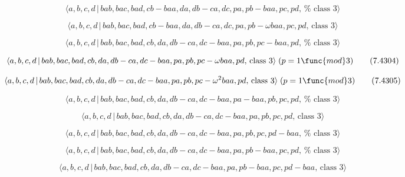 \documentclass[10pt]{article}
\begin{document}
\begin{equation}
\langle a,b,c,d\,|\,bab,bac,bad,cb-baa,da,db-ca,dc,pa,pb-baa,pc,pd,\,\text{%
class }3\rangle  \tag{7.4301}
\end{equation}

\begin{equation}
\langle a,b,c,d\,|\,bab,bac,bad,cb-baa,da,db-ca,dc,pa,pb-\omega baa,pc,pd,\,%
\text{class }3\rangle  \tag{7.4302}
\end{equation}

\begin{equation}
\langle a,b,c,d\,|\,bab,bac,bad,cb,da,db-ca,dc-baa,pa,pb,pc-baa,pd,\,\text{%
class }3\rangle  \tag{7.4303}
\end{equation}

\begin{equation}
\langle a,b,c,d\,|\,bab,bac,bad,cb,da,db-ca,dc-baa,pa,pb,pc-\omega baa,pd,\,%
\text{class }3\rangle \;(p=1\func{mod}3)  \tag{7.4304}
\end{equation}

\begin{equation}
\langle a,b,c,d\,|\,bab,bac,bad,cb,da,db-ca,dc-baa,pa,pb,pc-\omega
^{2}baa,pd,\,\text{class }3\rangle \;(p=1\func{mod}3)  \tag{7.4305}
\end{equation}

\begin{equation}
\langle a,b,c,d\,|\,bab,bac,bad,cb,da,db-ca,dc-baa,pa-baa,pb,pc,pd,\,\text{%
class }3\rangle  \tag{7.4306}
\end{equation}

\begin{equation}
\langle a,b,c,d\,|\,bab,bac,bad,cb,da,db-ca,dc-baa,pa,pb,pc,pd,\,\text{class 
}3\rangle  \tag{7.4307}
\end{equation}

\begin{equation}
\langle a,b,c,d\,|\,bab,bac,bad,cb,da,db-ca,dc-baa,pa,pb,pc,pd-baa,\,\text{%
class }3\rangle  \tag{7.4308}
\end{equation}

\begin{equation}
\langle a,b,c,d\,|\,bab,bac,bad,cb,da,db-ca,dc-baa,pa,pb-baa,pc,pd,\,\text{%
class }3\rangle  \tag{7.4309}
\end{equation}

\begin{equation}
\langle a,b,c,d\,|\,bab,bac,bad,cb,da,db-ca,dc-baa,pa,pb-baa,pc,pd-baa,\,%
\text{class }3\rangle  \tag{7.4310}
\end{equation}
\end{document}
